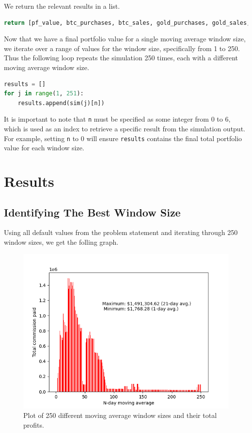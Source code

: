 \documentclass[12pt]{article}
\begin{document}
We return the relevant results in a list.
\\
\begin{lstlisting}[language=Python]
return [pf_value, btc_purchases, btc_sales, gold_purchases, gold_sales, commission_total]
\end{lstlisting}

Now that we have a final portfolio value for a single moving average window size, we iterate over a range of values for the window size, specifically from 1 to 250.
Thus the following loop repeats the simulation 250 times, each with a different moving average window size.
\\
\begin{lstlisting}[language=Python]
results = []
for j in range(1, 251):
    results.append(sim(j)[n])
\end{lstlisting}
It is important to note that \verb|n| must be specified as some integer from $0$ to $6$, which is used as an index to retrieve a specific result from the simulation output.
For example, setting \verb|n| to $0$ will ensure \verb|results| contains the final total portfolio value for each window size.
\section{Results}

\subsection{Identifying The Best Window Size}
Using all default values from the problem statement and iterating through 250 window sizes, we get the folling graph.

\begin{figure}[h!]
    \includegraphics[totalheight=8cm]{figures/total.png}
    \centering
    \caption{Plot of 250 different moving average window sizes and their total profits.}
    \label{total}
\end{figure}
\end{document}
